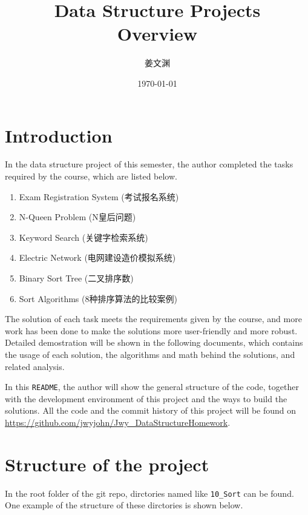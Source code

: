 \documentclass[cn,black,12pt,normal]{elegantnote}
\title{Data Structure Projects\\Overview}
\author{姜文渊}
\institute{School of Software Engineering, Tongji University}
\date{\today}
\begin{document}
\maketitle

\section{Introduction}

In the data structure project of this semester, the author completed the tasks required by the course, which are listed below.

\begin{enumerate}
    \item Exam Registration System (考试报名系统)
    \item N-Queen Problem (N皇后问题)
    \item Keyword Search (关键字检索系统)
    \item Electric Network (电网建设造价模拟系统)
    \item Binary Sort Tree (二叉排序数)
    \item Sort Algorithms (8种排序算法的比较案例)
\end{enumerate}

The solution of each task meets the requirements given by the course, and more work has been done to make the solutions more user-friendly and more robust. Detailed demostration will be shown in the following documents, which contains the usage of each solution, the algorithms and math behind the solutions, and related analysis.

In this \lstinline{README}, the author will show the general structure of the code, together with the development environment of this project and the ways to build the solutions. All the code and the commit history of this project will be found on \url{https://github.com/jwyjohn/Jwy_DataStructureHomework}.

\section{Structure of the project}

In the root folder of the git repo, dirctories named like \lstinline{10_Sort} can be found. One example of the structure of these dirctories is shown below.
\end{document}
